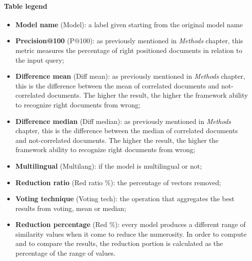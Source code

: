 \documentclass[\main/main.tex]{subfiles}
\begin{document}
\paragraph{Table legend}
\begin{itemize}
    \item \textbf{Model name} (Model): a label given starting from the original model name
    \item \textbf{Precision@100} (P@100): as previously mentioned in \emph{Methods} chapter, this metric measures the percentage of right positioned documents in relation to the input query;
    \item \textbf{Difference mean} (Diff mean): as previously mentioned in \emph{Methods} chapter, this is the difference between the mean of correlated documents and not-correlated documents. The higher the result, the higher the framework ability to recognize right documents from wrong;
    \item \textbf{Difference median} (Diff median): as previously mentioned in \emph{Methods} chapter, this is the difference between the median of correlated documents and not-correlated documents. The higher the result, the higher the framework ability to recognize right documents from wrong;
    \item \textbf{Multilingual} (Multilang): if the model is multilingual or not;
    \item \textbf{Reduction ratio} (Red ratio \%): the percentage of vectors removed;
    \item \textbf{Voting technique} (Voting tech): the operation that aggregates the best results from voting, mean or median;
    \item \textbf{Reduction percentage} (Red \%): every model produces a different range of similarity values when it come to reduce the numerosity. In order to compute and to compare the results, the reduction portion is calculated as the percentage of the range of values.
\end{itemize}

\newpage
\end{document}
